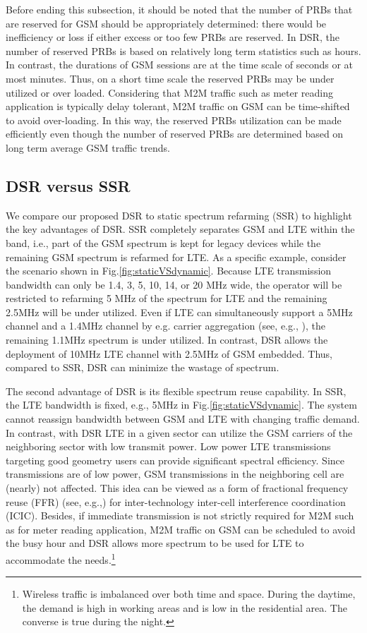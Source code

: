 \documentclass[10pt,journal]{IEEEtran}
\theoremstyle{slplain}
\begin{document}
Before ending this subsection, it should be noted that the number of PRBs that are reserved for GSM should be appropriately determined: there would be inefficiency or loss if either excess or too few PRBs are reserved. In DSR, the number of reserved PRBs is based on relatively long term statistics such as hours. In contrast, the durations of GSM sessions are at the time scale of seconds or at most minutes. Thus, on a short time scale the reserved PRBs may be under utilized or over loaded. Considering that M2M traffic such as meter reading application is typically delay tolerant, M2M traffic on GSM can be time-shifted to avoid over-loading. In this way, the reserved PRBs utilization can be made efficiently even though the number of reserved PRBs are determined based on long term average GSM traffic trends. 


\subsection{DSR versus SSR}

We compare our proposed DSR to static spectrum refarming (SSR) to highlight the key advantages of DSR. SSR completely separates GSM and LTE within the band, i.e., part of the GSM spectrum is kept for legacy devices while the remaining GSM spectrum is refarmed for LTE. As a specific example, consider the scenario shown in Fig.\ref{fig:staticVSdynamic}. Because LTE transmission bandwidth can only be 1.4, 3, 5, 10, 14, or 20 MHz wide, the operator will be restricted to refarming 5 MHz of the spectrum for LTE and the remaining 2.5MHz  will be under utilized. Even if LTE can simultaneously support a 5MHz channel and a 1.4MHz channel by e.g. carrier aggregation (see, e.g., \cite{Iamura2010CA, Shen2012over, lin2012modeling}), the remaining 1.1MHz spectrum is under utilized. In contrast, DSR allows the deployment of 10MHz LTE channel with 2.5MHz of GSM embedded. Thus, compared to SSR, DSR can minimize the wastage of spectrum.


The second advantage of DSR is its flexible spectrum reuse capability. In SSR, the LTE bandwidth is fixed, e.g., 5MHz in Fig.\ref{fig:staticVSdynamic}. The system cannot reassign bandwidth between GSM and LTE with changing traffic demand. In contrast, with DSR LTE in a given sector can utilize the GSM carriers of the neighboring sector with low transmit power. Low power LTE transmissions targeting good geometry users can provide significant spectral efficiency. Since transmissions are of low power,  GSM transmissions in the neighboring cell are (nearly) not affected. This idea can be viewed as a form of fractional frequency reuse (FFR) (see, e.g.,\cite{Boudreau2009Interference, Stolyar2008Self, Ali2009ffr}) for inter-technology inter-cell interference coordination (ICIC). Besides, if immediate transmission is not strictly required for M2M such as for meter reading application, M2M traffic on GSM can be scheduled to avoid the busy hour and DSR allows more spectrum to be used for LTE to accommodate the needs.\footnote{Wireless traffic is imbalanced over both time and space. During the daytime, the demand is high in working areas and is low in the residential area. The converse is true during the night.}
\end{document}
